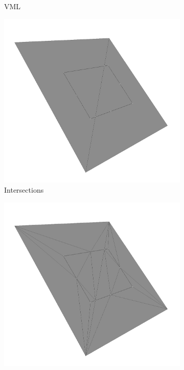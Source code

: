 \begin{figure}
\begin{subfigure}[t]{0.3\textwidth}
		\caption{VML}
		\label{fig:cube2_classified}
	\end{subfigure}
	\begin{subfigure}[t]{0.3\textwidth}
		\centering
		\includegraphics[width=\textwidth]{images/cube2_constraints}
		\caption{Intersections}
		\label{fig:cube2_constraints}
	\end{subfigure}
	\begin{subfigure}[t]{0.3\textwidth}
		\centering
		\includegraphics[width=\textwidth]{images/cube2_retriangulated}

\end{subfigure}
\end{figure}
